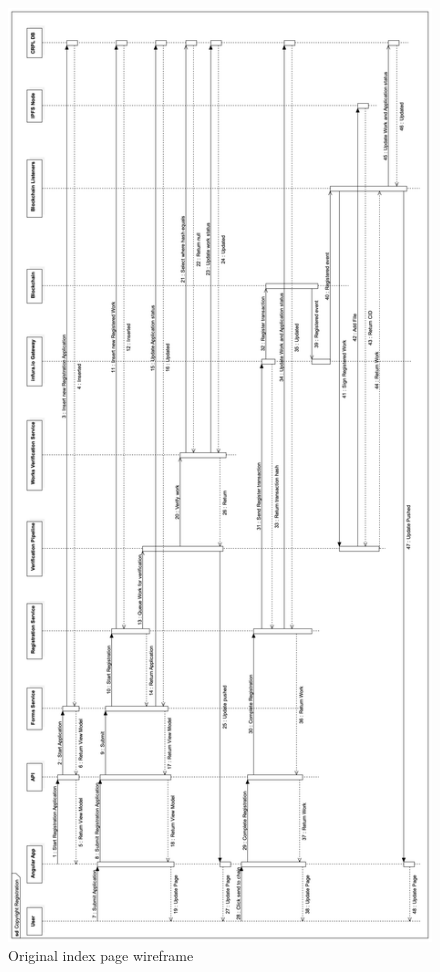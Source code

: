 \begin{figure}[H]
\caption{Original index page wireframe}
\centering
\includegraphics[width=\textwidth,height=\textheight,keepaspectratio]{images/operational/CopyrightRegistration}
\end{figure}

